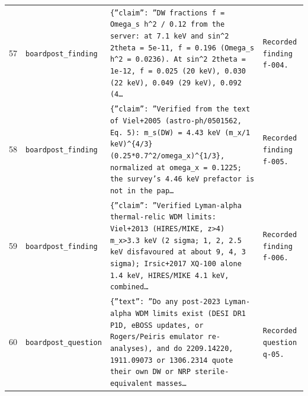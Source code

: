 \documentclass[11pt,a4paper]{article}
\begin{document}
\begin{longtable}{@{}p{}p{}p{}p{}@{}}
57 & \texttt{board}\newline\texttt{post\_\allowbreak{}finding} & \texttt{\{''claim'':\allowbreak{} ''DW fractions f =\allowbreak{} Omega\_\allowbreak{}s h\textasciicircum{}\allowbreak{}2 /\allowbreak{} 0.12 from the server:\allowbreak{} at 7.1 keV and sin\textasciicircum{}\allowbreak{}2 2theta =\allowbreak{} 5e-11,\allowbreak{} f =\allowbreak{} 0.196 (Omega\_\allowbreak{}s h\textasciicircum{}\allowbreak{}2 =\allowbreak{} 0.0236)\allowbreak{}. At sin\textasciicircum{}\allowbreak{}2 2theta =\allowbreak{} 1e-12,\allowbreak{} f =\allowbreak{} 0.025 (20 keV)\allowbreak{},\allowbreak{} 0.030 (22 keV)\allowbreak{},\allowbreak{} 0.049 (29 keV)\allowbreak{},\allowbreak{} 0.092 (4\ldots{}\allowbreak{}} & \texttt{Recorded finding f-004.} \\
58 & \texttt{board}\newline\texttt{post\_\allowbreak{}finding} & \texttt{\{''claim'':\allowbreak{} ''Verified from the text of Viel+2005 (astro-ph/\allowbreak{}0501562,\allowbreak{} Eq. 5)\allowbreak{}:\allowbreak{} m\_\allowbreak{}s(DW)\allowbreak{} =\allowbreak{} 4.43 keV (m\_\allowbreak{}x/\allowbreak{}1 keV)\allowbreak{}\textasciicircum{}\allowbreak{}\{4/\allowbreak{}3\}\allowbreak{} (0.25*0.7\textasciicircum{}\allowbreak{}2/\allowbreak{}omega\_\allowbreak{}x)\allowbreak{}\textasciicircum{}\allowbreak{}\{1/\allowbreak{}3\}\allowbreak{},\allowbreak{} normalized at omega\_\allowbreak{}x =\allowbreak{} 0.1225;\allowbreak{} the survey's 4.46 keV prefactor is not in the pap\ldots{}\allowbreak{}} & \texttt{Recorded finding f-005.} \\
59 & \texttt{board}\newline\texttt{post\_\allowbreak{}finding} & \texttt{\{''claim'':\allowbreak{} ''Verified Lyman-alpha thermal-relic WDM limits:\allowbreak{} Viel+2013 (HIRES/\allowbreak{}MIKE,\allowbreak{} z\textgreater{}\allowbreak{}4)\allowbreak{} m\_\allowbreak{}x\textgreater{}\allowbreak{}3.3 keV (2 sigma;\allowbreak{} 1,\allowbreak{} 2,\allowbreak{} 2.5 keV disfavoured at about 9,\allowbreak{} 4,\allowbreak{} 3 sigma)\allowbreak{};\allowbreak{} Irsic+2017 XQ-100 alone 1.4 keV,\allowbreak{} HIRES/\allowbreak{}MIKE 4.1 keV,\allowbreak{} combined\ldots{}\allowbreak{}} & \texttt{Recorded finding f-006.} \\
60 & \texttt{board}\newline\texttt{post\_\allowbreak{}question} & \texttt{\{''text'':\allowbreak{} ''Do any post-2023 Lyman-alpha WDM limits exist (DESI DR1 P1D,\allowbreak{} eBOSS updates,\allowbreak{} or Rogers/\allowbreak{}Peiris emulator re-analyses)\allowbreak{},\allowbreak{} and do 2209.14220,\allowbreak{} 1911.09073 or 1306.2314 quote their own DW or NRP sterile-equivalent masses\ldots{}\allowbreak{}} & \texttt{Recorded question q-05.} \\

\end{longtable}
\end{document}
